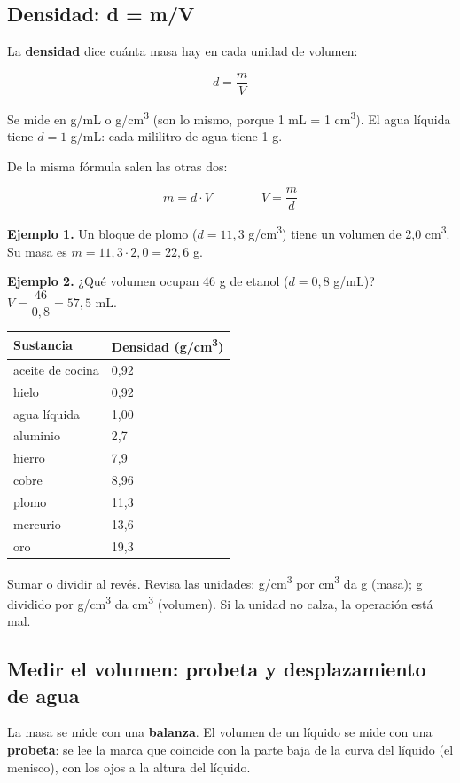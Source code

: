 \subsection{Densidad: d = m/V}
La \textbf{densidad} dice cuánta masa hay en cada unidad de volumen:

 \[ d = \dfrac{m}{V} \] 

Se mide en g/mL o g/cm\textsuperscript{3} (son lo mismo, porque 1 mL = 1 cm\textsuperscript{3}). El agua líquida tiene $d = 1$ g/mL: cada mililitro de agua tiene 1 g.

 

De la misma fórmula salen las otras dos:

 \[ m = d\cdot V \qquad\qquad V = \dfrac{m}{d} \] 

\textbf{Ejemplo 1.} Un bloque de plomo ($d = 11{,}3$ g/cm\textsuperscript{3}) tiene un volumen de 2,0 cm\textsuperscript{3}. Su masa es $m = 11{,}3\cdot 2{,}0 = 22{,}6$ g.

 

\textbf{Ejemplo 2.} ¿Qué volumen ocupan 46 g de etanol ($d = 0{,}8$ g/mL)? $V = \dfrac{46}{0{,}8} = 57{,}5$ mL.

  
\begin{center}\small
\begin{tabular}{@{}ll@{}}
\toprule
\textbf{Sustancia} & \textbf{Densidad (g/cm\textsuperscript{3})} \\
\midrule
aceite de cocina & 0,92 \\
hielo & 0,92 \\
agua líquida & 1,00 \\
aluminio & 2,7 \\
hierro & 7,9 \\
cobre & 8,96 \\
plomo & 11,3 \\
mercurio & 13,6 \\
oro & 19,3 \\
\bottomrule
\end{tabular}
\end{center}
 
\begin{ojo} Sumar o dividir al revés. Revisa las unidades: g/cm\textsuperscript{3} por cm\textsuperscript{3} da g (masa); g dividido por g/cm\textsuperscript{3} da cm\textsuperscript{3} (volumen). Si la unidad no calza, la operación está mal.\end{ojo}
\subsection{Medir el volumen: probeta y desplazamiento de agua}
La masa se mide con una \textbf{balanza}. El volumen de un líquido se mide con una \textbf{probeta}: se lee la marca que coincide con la parte baja de la curva del líquido (el menisco), con los ojos a la altura del líquido.

